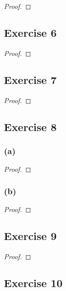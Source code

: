 \documentclass[14pt]{extarticle}
\begin{document}
\begin{proof}

\end{proof}

\subsection{Exercise 6}

\begin{proof}

\end{proof}

\subsection{Exercise 7}

\begin{proof}

\end{proof}

\subsection{Exercise 8}

\subsubsection{(a)}

\begin{proof}

\end{proof}

\subsubsection{(b)}

\begin{proof}

\end{proof}

\subsection{Exercise 9}

\begin{proof}

\end{proof}

\subsection{Exercise 10}
\end{document}
